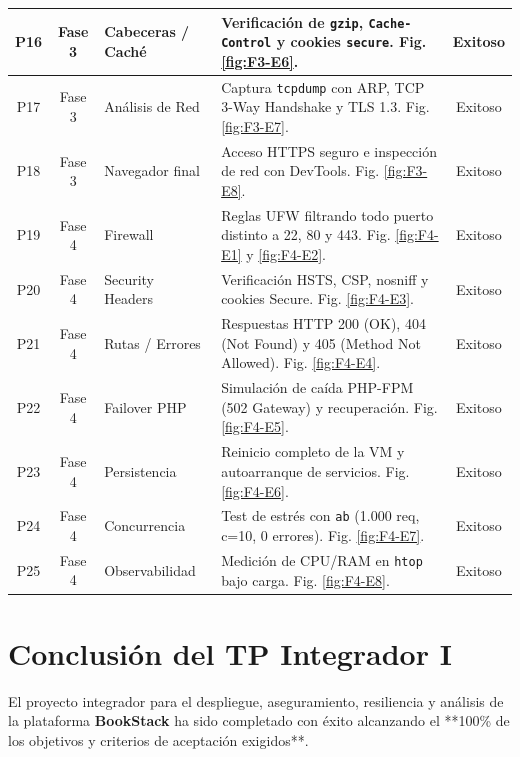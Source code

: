 \documentclass[12pt,a4paper]{article}
\begin{document}
\begin{xltabular}{\textwidth}{|c|c|>{\raggedright\arraybackslash}p{2.3cm}|X|c|}
P16 & Fase 3 & Cabeceras / Caché & Verificación de \texttt{gzip}, \texttt{Cache-Control} y cookies \texttt{secure}. Fig. \ref{fig:F3-E6}. & Exitoso \\ \hline
P17 & Fase 3 & Análisis de Red & Captura \texttt{tcpdump} con ARP, TCP 3-Way Handshake y TLS 1.3. Fig. \ref{fig:F3-E7}. & Exitoso \\ \hline
P18 & Fase 3 & Navegador final & Acceso HTTPS seguro e inspección de red con DevTools. Fig. \ref{fig:F3-E8}. & Exitoso \\ \hline
P19 & Fase 4 & Firewall & Reglas UFW filtrando todo puerto distinto a 22, 80 y 443. Fig. \ref{fig:F4-E1} y \ref{fig:F4-E2}. & Exitoso \\ \hline
P20 & Fase 4 & Security Headers & Verificación HSTS, CSP, nosniff y cookies Secure. Fig. \ref{fig:F4-E3}. & Exitoso \\ \hline
P21 & Fase 4 & Rutas / Errores & Respuestas HTTP 200 (OK), 404 (Not Found) y 405 (Method Not Allowed). Fig. \ref{fig:F4-E4}. & Exitoso \\ \hline
P22 & Fase 4 & Failover PHP & Simulación de caída PHP-FPM (502 Gateway) y recuperación. Fig. \ref{fig:F4-E5}. & Exitoso \\ \hline
P23 & Fase 4 & Persistencia & Reinicio completo de la VM y autoarranque de servicios. Fig. \ref{fig:F4-E6}. & Exitoso \\ \hline
P24 & Fase 4 & Concurrencia & Test de estrés con \texttt{ab} (1.000 req, c=10, 0 errores). Fig. \ref{fig:F4-E7}. & Exitoso \\ \hline
P25 & Fase 4 & Observabilidad & Medición de CPU/RAM en \texttt{htop} bajo carga. Fig. \ref{fig:F4-E8}. & Exitoso \\ \hline
\end{xltabular}
\normalsize

\section{Conclusión del TP Integrador I}
El proyecto integrador para el despliegue, aseguramiento, resiliencia y análisis de la plataforma \textbf{BookStack} ha sido completado con éxito alcanzando el **100\% de los objetivos y criterios de aceptación exigidos**.
\end{document}
